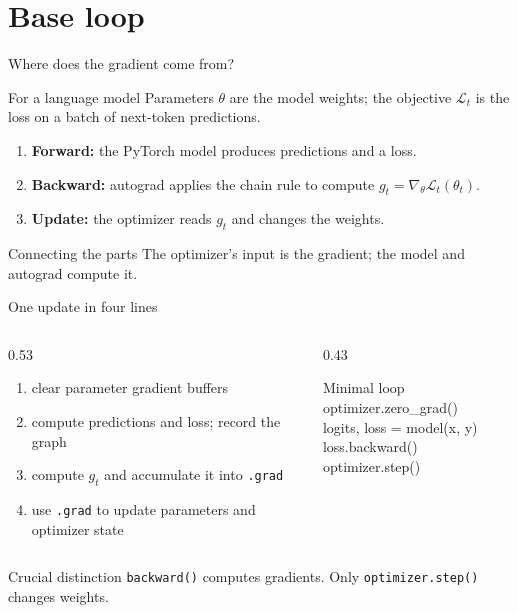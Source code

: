 \documentclass[handout]{beamer}
\begin{document}
\section{Base loop}

\begin{frame}{Where does the gradient come from?}
  \begin{block}{For a language model}
    Parameters $\theta$ are the model weights; the objective $\mathcal L_t$ is the loss on a batch of next-token predictions.
  \end{block}
  \begin{enumerate}
      \setlength{\itemsep}{7pt}
    \item \textbf{Forward:} the PyTorch model produces predictions and a loss.
    \item \textbf{Backward:} autograd applies the chain rule to compute $g_t=\nabla_\theta\mathcal L_t(\theta_t)$.
    \item \textbf{Update:} the optimizer reads $g_t$ and changes the weights.
  \end{enumerate}
  \begin{alertblock}{Connecting the parts}
    The optimizer's input is the gradient; the model and autograd compute it.
  \end{alertblock}
\end{frame}

\begin{frame}{One update in four lines}
  \begin{columns}[c]
    \begin{column}{0.53\linewidth}
      \begin{enumerate}
          \setlength{\itemsep}{7pt}
        \item clear parameter gradient buffers
        \item compute predictions and loss; record the graph
        \item compute $g_t$ and accumulate it into \texttt{.grad}
        \item use \texttt{.grad} to update parameters and optimizer state
      \end{enumerate}
    \end{column}
    \begin{column}{0.43\linewidth}
      \begin{block}{Minimal loop}
        \ttfamily\scriptsize
        optimizer.zero\_grad()\\
        logits, loss = model(x, y)\\
        loss.backward()\\
        optimizer.step()
      \end{block}
    \end{column}
  \end{columns}
  \begin{alertblock}{Crucial distinction}
    \texttt{backward()} computes gradients. Only \texttt{optimizer.step()} changes weights.
  \end{alertblock}
\end{frame}
\end{document}
